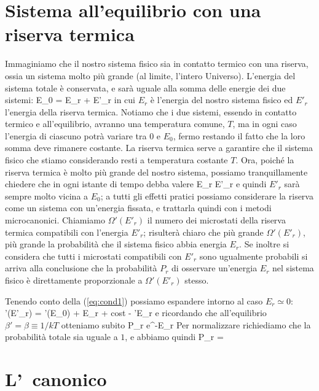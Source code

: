 \section{Sistema all'equilibrio con una riserva termica}

Immaginiamo che il nostro sistema fisico sia in contatto termico con una riserva, ossia un sistema molto più grande (al limite, l'intero Universo). L'energia del sistema totale è conservata, e sarà uguale alla somma delle energie dei due sistemi:
\be
E_0 = E_r + E'_r
\ee
in cui $E_r$ è l'energia del nostro sistema fisico ed $E'_r$ l'energia della riserva termica. Notiamo che i due sistemi, essendo in contatto termico e all'equilibrio, avranno una temperatura comune, $T$, ma in ogni caso l'energia di ciascuno potrà variare tra $0$ e $E_0$, fermo restando il fatto che la loro somma deve rimanere costante. La riserva termica serve a garantire che il sistema fisico che stiamo considerando resti a temperatura costante $T$. Ora, poiché la riserva termica è molto più grande del nostro sistema, possiamo tranquillamente chiedere che in ogni istante di tempo debba valere
\be
\label{eq:cond1}
E_r \ll E'_r
\ee
e quindi $E'_r$ sarà sempre molto vicina a $E_0$; a tutti gli effetti pratici possiamo considerare la riserva come un sistema con un'energia fissata, e trattarla quindi con i metodi microcanonici.
Chiamiamo $\Omega'(E'_r)$ il numero dei microstati della riserva termica compatibili con l'energia $E'_r$; risulterà chiaro che più grande $\Omega'(E'_r)$, più grande la probabilità che il sistema fisico abbia energia $E_r$. Se inoltre si considera che tutti i microstati compatibili con $E'_r$ sono ugualmente probabili si arriva alla conclusione che la probabilità $P_r$ di osservare un'energia $E_r$ nel sistema fisico è direttamente proporzionale a $\Omega'(E'_r)$ stesso.

Tenendo conto della (\ref{eq:cond1}) possiamo espandere intorno al caso $E_r \simeq 0$:
\be
\ln\Omega'(E'_r) = \ln\Omega'(E_0) + E_r + \cdots \simeq \mbox{\textrm{cost}} - \beta'E_r
\ee
e ricordando che all'equilibrio $\beta' = \beta \equiv 1/kT$ otteniamo subito
\be
P_r \propto e^{-\beta E_r}
\ee
Per normalizzare richiediamo che la probabilità totale sia uguale a $1$, e abbiamo quindi
\be
P_r = 
\ee

\section{L'\ensemble\ canonico}

